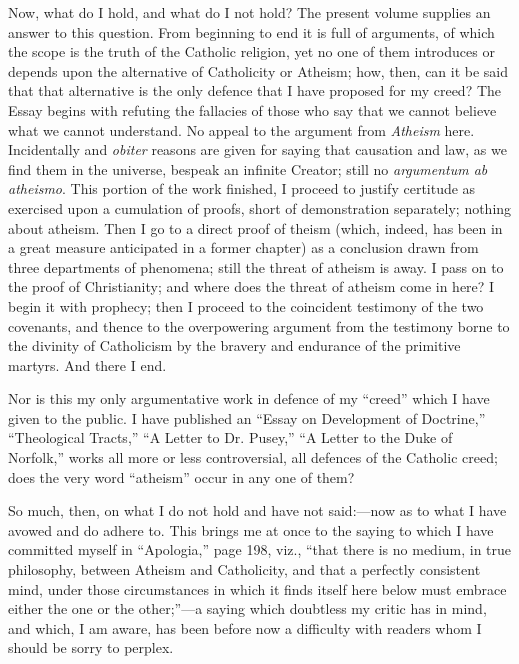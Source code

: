 Now, what do I hold, and what do I not hold? The present volume
supplies an answer to this question. From beginning to end it is full
of arguments, of which the scope is the truth of the Catholic
religion, yet no one of them introduces or depends upon the
alternative of Catholicity or Atheism; how, then, can it be said that
that alternative is the only defence that I have proposed for my
creed? The Essay begins with refuting the fallacies of those who say
that we cannot believe what we cannot understand. No appeal to the
argument from \emph{Atheism} here. Incidentally and \emph{obiter} reasons
are given for saying that causation and law, as we find them in
the universe, bespeak an infinite Creator; still no \emph{argumentum ab
atheismo}. This portion of the work finished, I proceed to justify
certitude as exercised upon a cumulation of proofs, short of
demonstration separately; nothing about atheism. Then I go to a direct
proof of theism (which, indeed, has been in a great measure
anticipated in a former chapter) as a conclusion drawn from three
departments of phenomena; still the threat of atheism is away. I pass
on to the proof of Christianity; and where does the threat of atheism
come in here? I begin it with prophecy; then I proceed to the
coincident testimony of the two covenants, and thence to the
overpowering argument from the testimony borne to the divinity of
Catholicism by the bravery and endurance of the primitive martyrs. And
there I end.


Nor is this my only argumentative work in defence of my
``creed'' which I have given to the public. I have published
an ``Essay on Development of
Doctrine,'' ``Theological
Tracts,'' ``A Letter to Dr.
Pusey,'' ``A Letter to the
Duke of Norfolk,'' works all more or less controversial, all
defences of the Catholic creed; does the very word ``atheism''
occur in any one of them?


So much, then, on what I do not hold and have not said:—now as to
what I have avowed and do adhere to. This brings me at once to the
saying to which I have committed myself in ``Apologia,'' page
198, viz., ``that there is no medium, in true philosophy, between
Atheism and Catholicity, and that a perfectly consistent mind, under
those circumstances in which it finds itself here below must embrace
either the one or the other;''—a saying which doubtless my
critic has in mind, and which, I am aware, has been before now a
difficulty with readers whom I should be sorry to perplex.


